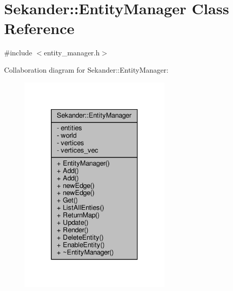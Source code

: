 \hypertarget{classSekander_1_1EntityManager}{}\section{Sekander\+:\+:Entity\+Manager Class Reference}
\label{classSekander_1_1EntityManager}


{\ttfamily \#include $<$entity\+\_\+manager.\+h$>$}



Collaboration diagram for Sekander\+:\+:Entity\+Manager\+:
\nopagebreak
\begin{figure}[H]
\begin{center}
\leavevmode
\includegraphics[width=207pt]{classSekander_1_1EntityManager__coll__graph}
\end{center}
\end{figure}
